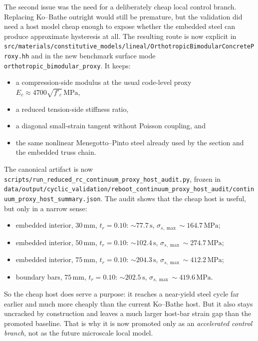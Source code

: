 The second issue was the need for a deliberately cheap local control branch.
Replacing Ko--Bathe outright would still be premature, but the validation did
need a host model cheap enough to expose whether the embedded steel can produce
approximate hysteresis at all. The resulting route is now explicit in
\texttt{src/materials/constitutive\_models/lineal/OrthotropicBimodularConcreteProxy.hh}
and in the new benchmark surface mode
\texttt{orthotropic\_bimodular\_proxy}. It keeps:
\begin{itemize}
  \item a compression-side modulus at the usual code-level proxy
    \(E_c \approx 4700\sqrt{f'_c}\,\mathrm{MPa}\),
  \item a reduced tension-side stiffness ratio,
  \item a diagonal small-strain tangent without Poisson coupling, and
  \item the same nonlinear Menegotto--Pinto steel already used by the section
    and the embedded truss chain.
\end{itemize}

The canonical artifact is now
\texttt{scripts/run\_reduced\_rc\_continuum\_proxy\_host\_audit.py}, frozen in
\texttt{data/output/cyclic\_validation/reboot\_continuum\_proxy\_host\_audit/continuum\_proxy\_host\_summary.json}.
The audit shows that the cheap host is useful, but only in a narrow sense:
\begin{itemize}
  \item embedded interior, \(30\,\mathrm{mm}\), \(t_r = 0.10\):
    \(\sim 77.7\,\mathrm{s}\), \(\sigma_{s,\max}\sim 164.7\,\mathrm{MPa}\);
  \item embedded interior, \(50\,\mathrm{mm}\), \(t_r = 0.10\):
    \(\sim 102.4\,\mathrm{s}\), \(\sigma_{s,\max}\sim 274.7\,\mathrm{MPa}\);
  \item embedded interior, \(75\,\mathrm{mm}\), \(t_r = 0.10\):
    \(\sim 204.3\,\mathrm{s}\), \(\sigma_{s,\max}\sim 412.2\,\mathrm{MPa}\);
  \item boundary bars, \(75\,\mathrm{mm}\), \(t_r = 0.10\):
    \(\sim 202.5\,\mathrm{s}\), \(\sigma_{s,\max}\sim 419.6\,\mathrm{MPa}\).
\end{itemize}

So the cheap host does serve a purpose: it reaches a near-yield steel cycle far
earlier and much more cheaply than the current Ko--Bathe host. But it also
stays uncracked by construction and leaves a much larger host-bar strain gap
than the promoted baseline. That is why it is now promoted only as an
\emph{accelerated control branch}, not as the future microscale local model.

